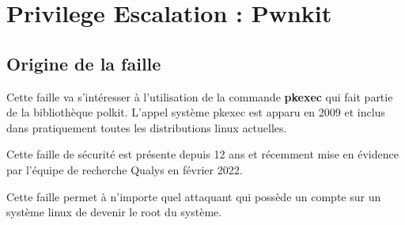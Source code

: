 \documentclass[12pt,a4paper]{article}
\begin{document}
   \section{Privilege Escalation : Pwnkit}   		
		\subsection{Origine de la faille}   
   		\begin{flushleft}
   			\noindent Cette faille va s'intéresser à l'utilisation de la commande \textbf{pkexec} qui fait partie de la bibliothèque polkit. L'appel système pkexec est apparu en 2009 et inclus dans pratiquement toutes les distributions linux actuelles.
   			\item Cette faille de sécurité est présente depuis 12 ans et récemment mise en évidence par l'équipe de recherche Qualys en février 2022. \cite{qualys}
   			\item Cette faille permet à n’importe quel attaquant qui possède un compte sur un système linux de devenir le root du système.

\end{flushleft}
\end{document}
